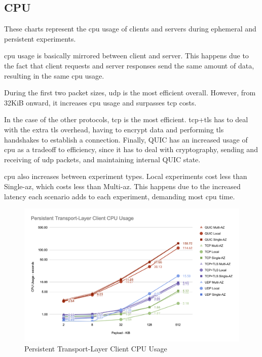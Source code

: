 \subsection{CPU}

These charts represent the \gls{cpu} usage of clients and servers during ephemeral and persistent experiments.

\gls{cpu} usage is basically mirrored between client and server. This happens due to the fact that client requests and server responses send the same amount of data, resulting in the same \gls{cpu} usage.

During the first two packet sizes, \gls{udp} is the most efficient overall. However, from 32KiB onward, it increases \gls{cpu} usage and surpasses \gls{tcp} costs.

In the case of the other protocols, \gls{tcp} is the most efficient. \gls{tcp}+\gls{tls} has to deal with the extra \gls{tls} overhead, having to encrypt data and performing \gls{tls} handshakes to establish a connection. Finally, QUIC has an increased usage of \gls{cpu} as a tradeoff to efficiency, since it has to deal with cryptography, sending and receiving of \gls{udp} packets, and maintaining internal QUIC state.

\gls{cpu} also increases between experiment types. Local experiments cost less than Single-\gls{az}, which costs less than Multi-\gls{az}. This happens due to the increased latency each scenario adds to each experiment, demanding most \gls{cpu} time.

\clearpage

\begin{figure}[h!]
    \centering
    \includegraphics[width=\linewidth]{figures/charts/Persistent Transport-Layer Client CPU Usage.png}
    \caption{Persistent Transport-Layer Client CPU Usage}
    \label{fig:persistent_client_transport_cpu}
\end{figure}

